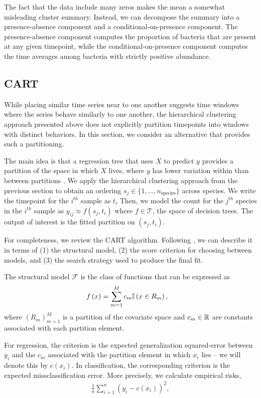 \documentclass[14pt]{extarticle}
\begin{document}
The fact that the data include many zeros makes the mean a somewhat misleading
cluster summary. Instead, we can decompose the summary into a presence-absence
component and a conditional-on-presence component. The presence-absence
component computes the proportion of bacteria that are present at any given
timepoint, while the conditional-on-presence component computes the time
averages among bacteria with strictly positive abundance.

\subsection{CART}

While placing similar time series near to one another suggests time windows
where the series behave similarly to one another, the hierarchical clustering
approach presented above does not explicitly partition timepoints into windows
with distinct behaviors. In this section, we consider an alternative that
provides such a partitioning.

The main idea is that a regression tree that uses $X$ to predict $y$ provides a
partition of the space in which $X$ lives, where $y$ has lower variation within
than between partitions \citep{breiman1984classification}. We apply the
hierarchical clustering approach from the previous section to obtain an ordering
$s_{j} \in \{1, \dots, n_{\text{species}}\}$ across species. We write the
timepoint for the $i^{th}$ sample as $t_{i}$ Then, we model the count for the
$j^{th}$ species in the $i^{th}$ sample as $y_{ij} \approx f\left(s_{j},
t_{i}\right)$ where $f \in \mathcal{T}$, the space of decision trees. The output
of interest is the fitted partition on $\left(s_{j}, t_{i}\right)$.

For completeness, we review the CART algorithm. Following \citep{stat315bnotes},
we can describe it in terms of (1) the structural model, (2) the score criterion
for choosing between models, and (3) the search strategy used to produce the
final fit.

The structural model $\mathcal{F}$ is the class of functions that can be
expressed as
\begin{align*}
f\left(x\right) &= \sum_{m = 1}^{M} c_{m} \mathbb{I}\left({x \in R_{m}}\right),
\end{align*}
where $\left(R_{m}\right)_{m = 1}^{M}$ is a partition of the covariate space
and $c_{m} \in \mathbb{R}$ are constants associated with each partition element.

For regression, the criterion is the expected generalization squared-error
between $y_{i}$ and the $c_{m}$ associated with the partition element in which
$x_i$ lies -- we will denote this by $c\left(x_{i}\right)$. In classification,
the corresponding criterion is the expected missclassification error. More
precisely, we calculate empirical risks,
\begin{align*}
  \frac{1}{n} \sum_{i = 1}^{n} \left(y_{i} - c\left(x_{i}\right)\right)^{2},
\end{align*}
\end{document}
